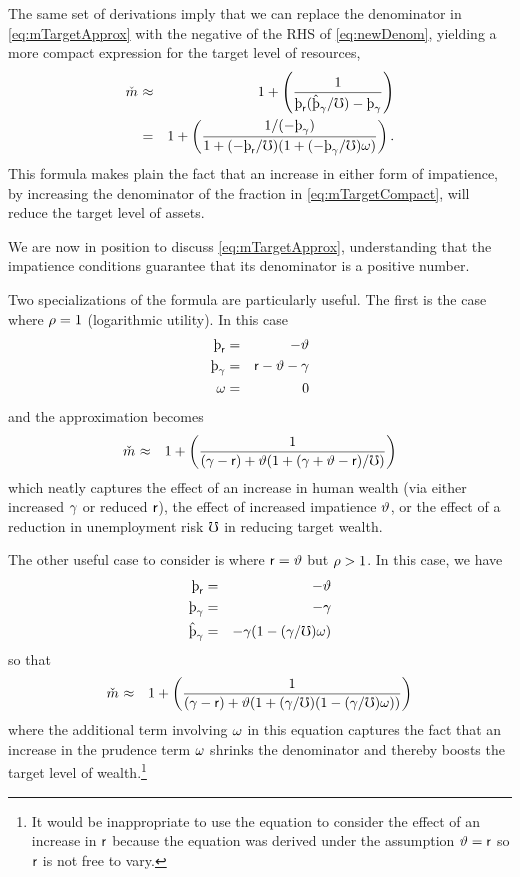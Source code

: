 \message{ !name(TractableBufferStock.tex)}\documentclass{handout}
\begin{document}
The same set of derivations imply that we can
replace the denominator in \eqref{eq:mTargetApprox} with the negative
of the RHS of \eqref{eq:newDenom}, yielding a more compact expression
for the target level of resources,
\begin{eqnarray}
 \mTarg^{\null} & \approx & 1 + \left(\frac{1}{\patr(\patpGrohat/\urate) - \patpGro }\right)
\\ & = & 1 + \left(\frac{1/(-\patpGro)}{1+(-\patr/\urate)(1+(-\patpGro/\urate)\prudEx)  }\right) \label{eq:mTargetCompact}
.
\end{eqnarray}
This formula makes plain the fact that an
increase in either form of impatience, by increasing the denominator of the 
fraction in 
\eqref{eq:mTargetCompact}, will reduce the target level of assets.

We are now in position to discuss \eqref{eq:mTargetApprox}, understanding that the
impatience conditions guarantee that its denominator is a positive number.

Two specializations of the formula are particularly useful.  The first is
the case where $\rho = 1$ (logarithmic utility).  In this case
\begin{eqnarray}
    \patr & = & -\timeRate
\\  \patpGro & = & \rfree-\timeRate-\pGro
\\  \prudEx & = & 0
\end{eqnarray}
and the approximation becomes
\begin{eqnarray}
 \mTarg^{\null} & \approx & 1 + \left(\frac{1}{(\pGro-\rfree)+\timeRate(1+(\pGro+\timeRate-\rfree)/\urate)}\right)
\end{eqnarray}
which neatly captures the effect of an increase in human wealth (via either increased $\gamma$ or reduced $\mathsf{r}$), the effect of increased impatience $\vartheta$,
or the effect of a reduction in unemployment risk $\mho$ in reducing target wealth.


The other useful case to consider is where $\mathsf{r} = \vartheta$ but $\rho>1$.  In this case, we have
\begin{eqnarray}
    \patr & = & -\timeRate
\\  \patpGro & = & -\pGro
\\  \patpGrohat & = & -\pGro (1-(\pGro/\urate)\prudEx)
\end{eqnarray}
so that
\begin{eqnarray}
 \mTarg^{\null} & \approx & 1 + \left(\frac{1}{(\pGro-\rfree)+\timeRate(1+(\pGro/\urate)(1-(\pGro/\urate)\prudEx))}\right)
\end{eqnarray}
where the additional term involving $\omega$ in this equation
captures the fact that an increase in the prudence term $\omega$
shrinks the denominator and thereby boosts the target level of
wealth.\footnote{It would be inappropriate to use the equation to
  consider the effect of an increase in $\mathsf{r}$ because the equation was derived under the
  assumption $\vartheta=\mathsf{r}$ so $\mathsf{r}$ is not free to vary.}
\end{document}
